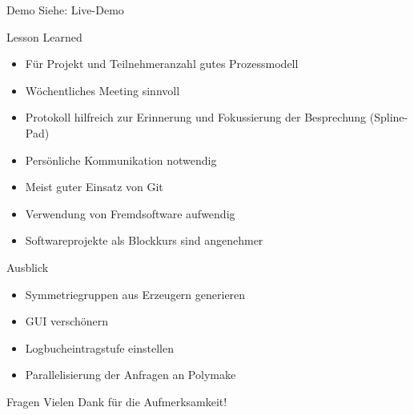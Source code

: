 \documentclass[ucs,11pt]{beamer}
\begin{document}
\begin{frame}{Demo}
\huge{Siehe: Live-Demo}
\end{frame}

\begin{frame}{Lesson Learned}
	\begin{itemize}
		\item Für Projekt und Teilnehmeranzahl gutes Prozessmodell \pause
		\item Wöchentliches Meeting sinnvoll \pause
		\item Protokoll hilfreich zur Erinnerung und Fokussierung der Besprechung (Spline-Pad) \pause
		\item Persönliche Kommunikation notwendig \pause
		\item Meist guter Einsatz von Git \pause
		\item Verwendung von Fremdsoftware aufwendig \pause
		\item Softwareprojekte als Blockkurs sind angenehmer \pause
	\end{itemize}
\end{frame}

\begin{frame}{Ausblick}
\begin{itemize}
	\item Symmetriegruppen aus Erzeugern generieren
	\item GUI verschönern
	\item Logbucheintragstufe einstellen
	\item Parallelisierung der Anfragen an Polymake
\end{itemize}
\end{frame}


\begin{frame}[t]{Fragen}
\vspace{1cm}
\huge{Vielen Dank für die Aufmerksamkeit!} \\
\vspace{1cm}
\end{frame}
\end{document}
